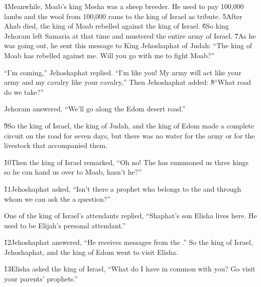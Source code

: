 \v{4}Meanwhile, Moab's king Mesha was a sheep breeder. He used to pay 100,000 lambs and the wool from 100,000 rams to the king of Israel as tribute. \v{5}After Ahab died, the king of Moab rebelled against the king of Israel. \v{6}So king Jehoram left Samaria at that time and mustered the entire army of Israel. \v{7}As he was going out, he sent this message to King Jehoshaphat of Judah: ``The king of Moab has rebelled against me. Will you go with me to fight Moab?''

``I'm coming,'' Jehoshaphat replied. ``I'm like you! My army will act like your army and my cavalry like your cavalry,'' Then Jehoshaphat added: \v{8}``What road do we take?''

Jehoram answered, ``We'll go along the Edom desert road.''

\v{9}So the king of Israel, the king of Judah, and the king of Edom made a complete circuit on the road for seven days, but there was no water for the army or for the livestock that accompanied them.

\v{10}Then the king of Israel remarked, ``Oh no! The  has summoned us three kings so he can hand us over to Moab, hasn't he?''

\v{11}Jehoshaphat asked, ``Isn't there a prophet who belongs to the  and through whom we can ask the  a question?''

One of the king of Israel's attendants replied, ``Shaphat's son Elisha lives here. He used to be Elijah's personal attendant.''

\v{12}Jehoshaphat answered, ``He receives messages from the .'' So the king of Israel, Jehoshaphat, and the king of Edom went to visit Elisha.

\v{13}Elisha asked the king of Israel, ``What do I have in common with you? Go visit your parents' prophets.''

